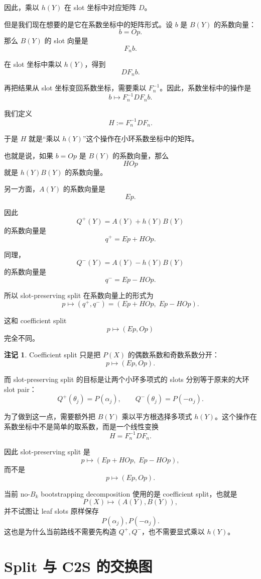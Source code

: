 \documentclass[UTF8,11pt]{ctexart}
\theoremstyle{definition}
\newtheorem{remark}{注记}
\begin{document}
因此，乘以 \(h(Y)\) 在 slot 坐标中对应矩阵 \(D\)。

但是我们现在想要的是它在系数坐标中的矩阵形式。设 \(b\) 是 \(B(Y)\) 的系数向量：
\[
b=Op.
\]
那么 \(B(Y)\) 的 slot 向量是
\[
F_n b.
\]

在 slot 坐标中乘以 \(h(Y)\)，得到
\[
D F_n b.
\]

再把结果从 slot 坐标变回系数坐标，需要乘以 \(F_n^{-1}\)。因此，系数坐标中的操作是
\[
b\longmapsto F_n^{-1}D F_n b.
\]

我们定义
\[
H:=F_n^{-1}DF_n.
\]

于是 \(H\) 就是“乘以 \(h(Y)\)”这个操作在小环系数坐标中的矩阵。

也就是说，如果 \(b=Op\) 是 \(B(Y)\) 的系数向量，那么
\[
HOp
\]
就是 \(h(Y)B(Y)\) 的系数向量。

另一方面，\(A(Y)\) 的系数向量是
\[
Ep.
\]

因此
\[
Q^+(Y)=A(Y)+h(Y)B(Y)
\]
的系数向量是
\[
q^+=Ep+HOp.
\]

同理，
\[
Q^-(Y)=A(Y)-h(Y)B(Y)
\]
的系数向量是
\[
q^-=Ep-HOp.
\]

所以 slot-preserving split 在系数向量上的形式为
\[
p\longmapsto(q^+,q^-)
=
(Ep+HOp,\;Ep-HOp).
\]

这和 coefficient split
\[
p\longmapsto(Ep,Op)
\]
完全不同。

\begin{remark}
Coefficient split 只是把 \(P(X)\) 的偶数系数和奇数系数分开：
\[
p\mapsto(Ep,Op).
\]

而 slot-preserving split 的目标是让两个小环多项式的 slots 分别等于原来的大环 slot pair：
\[
Q^+(\theta_j)=P(\alpha_j),
\qquad
Q^-(\theta_j)=P(-\alpha_j).
\]

为了做到这一点，需要额外把 \(B(Y)\) 乘以平方根选择多项式 \(h(Y)\)。这个操作在系数坐标中不是简单的取系数，而是一个线性变换
\[
H=F_n^{-1}DF_n.
\]

因此 slot-preserving split 是
\[
p\mapsto(Ep+HOp,\;Ep-HOp),
\]
而不是
\[
p\mapsto(Ep,Op).
\]

当前 no-\(B_k\) bootstrapping decomposition 使用的是 coefficient split，也就是
\[
P(X)\mapsto(A(Y),B(Y)),
\]
并不试图让 leaf slots 原样保存
\[
P(\alpha_j),P(-\alpha_j).
\]
这也是为什么当前路线不需要先构造 \(Q^+,Q^-\)，也不需要显式乘以 \(h(Y)\)。
\end{remark}

\section{Split 与 C2S 的交换图}
\end{document}
